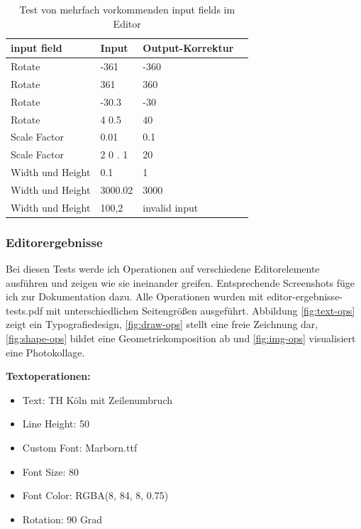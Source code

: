 \begin{table}[!htbp]
	\centering
	\begin{tabular}{|p{4cm}|p{3cm}|p{3cm}|p{3cm}|}
		\hline
		\textbf{input field}	& \textbf{Input} 	& \textbf{Output-Korrektur}		\\ 
		\hline
		Rotate					& -361 						& -360  				\\
		Rotate					& 361 						& 360 					\\ 
		Rotate					& -30.3 					& -30  					\\
		Rotate					& 4 0.5 					& 40 					\\ 
		Scale Factor			& 0.01						& 0.1 					\\
		Scale Factor			& 2 0 . 1					& 20 					\\
		Width und Height		& 0.1						& 1 					\\
		Width und Height		& 3000.02					& 3000 					\\
		Width und Height		& 100,2						& invalid input 		\\
		\hline
	\end{tabular}
	\caption{Test von mehrfach vorkommenden input fields im Editor}
	\label{table:editor-input}
\end{table}

\subsubsection{Editorergebnisse}
Bei diesen Tests werde ich Operationen auf verschiedene Editorelemente ausführen und zeigen wie sie ineinander greifen. Entsprechende Screenshots füge ich zur Dokumentation dazu. Alle Operationen wurden mit editor-ergebnisse-tests.pdf mit unterschiedlichen Seitengrößen ausgeführt. Abbildung \ref{fig:text-ops} zeigt ein Typografiedesign, \ref{fig:draw-ops} stellt eine freie Zeichnung dar, \ref{fig:shape-ops} bildet eine Geometriekomposition ab und \ref{fig:img-ops} visualisiert eine Photokollage.

\textbf{Textoperationen:}
\begin{itemize}
	\item Text: TH Köln mit Zeilenumbruch
	\item Line Height: 50
	\item Custom Font: Marborn.ttf
	\item Font Size: 80
	\item Font Color: RGBA(8, 84, 8, 0.75)
	\item Rotation: 90 Grad
\end{itemize}

